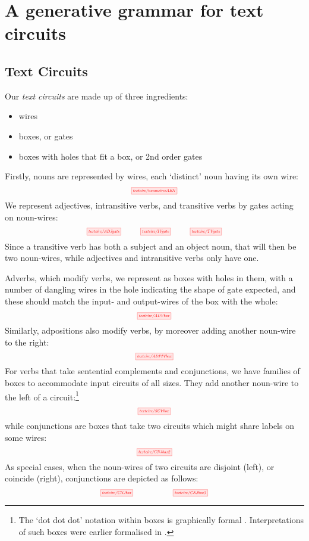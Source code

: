 \section{A generative grammar for text circuits}

\subsection{Text Circuits}

Our \emph{text circuits} are made up of three ingredients:
\begin{itemize}
\item wires
\item boxes, or gates
\item boxes with holes that fit a box, or 2nd order gates
\end{itemize}
Firstly, nouns are represented by wires, each `distinct' noun having its own wire:
\[
\scalebox{0.5}{\tikzfig{textcirc/nounwiresABN}} 
\]
We represent adjectives, intransitive verbs, and transitive verbs by gates acting on noun-wires: 
\[
\scalebox{0.5}{\tikzfig{textcirc/ADJgate} \quad\quad\quad \tikzfig{textcirc/IVgate} \quad\quad\quad \tikzfig{textcirc/TVgate}}
\]
Since a transitive verb has both a subject and an object  noun, that will then be two noun-wires, while adjectives and intransitive verbs only have one. 

Adverbs, which modify verbs, we represent as boxes with holes in them, with a number of dangling wires in the hole indicating the shape of gate expected, and these should match the input- and output-wires  of the box with the whole:
\[
\scalebox{0.5}{\tikzfig{textcirc/ADVbox}}
\]
Similarly, adpositions also modify verbs, by moreover adding another noun-wire to the right:
\[
\scalebox{0.5}{\tikzfig{textcirc/ADPIVbox}}
\]
For verbs that take sentential complements and conjunctions, we have families of boxes to accommodate input circuits of all sizes. They add another noun-wire to the left of a circuit:\footnote{The `dot dot dot' notation within boxes is graphically formal \cite{wilson_string_2022}. Interpretations of such boxes were earlier formalised in \cite{merry_reasoning_2014,quick_-logic_2015,zamdzhiev_rewriting_2017}.}
\[
\scalebox{0.5}{\tikzfig{textcirc/SCVbox}}
\]
while conjunctions are boxes that take two circuits which might share labels on some wires:
\[
\scalebox{0.5}{\tikzfig{textcirc/CNJbox2}}
\]
As special cases, when the noun-wires of two circuits are disjoint (left), or coincide (right), conjunctions are depicted as follows:
\[
\scalebox{0.5}{\tikzfig{textcirc/CNJbox} \qquad\qquad\qquad\qquad \tikzfig{textcirc/CNJbox3}}
\]

